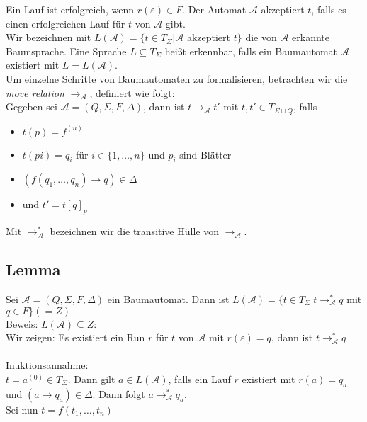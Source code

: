\documentclass[titlepage]{article}
\begin{document}
Ein Lauf ist erfolgreich, wenn $r(\varepsilon) \in F$. 
Der Automat $\mathcal{A}$ akzeptiert $t$, falls es einen erfolgreichen Lauf
f\"ur $t$ von $\mathcal{A}$ gibt.\\
Wir bezeichnen mit $L(\mathcal{A}) = \{t \in T_{\Sigma} | \mathcal{A}$ akzeptiert $t\}$ 
die von $\mathcal{A}$ erkannte Baumsprache. 
Eine Sprache $L \subseteq T_{\Sigma}$ hei\ss t erkennbar, falls ein Baumautomat 
$\mathcal{A}$ existiert mit $L=L(\mathcal{A})$.\\

Um einzelne Schritte von Baumautomaten zu formalisieren, betrachten wir die 
\textit{move relation} $\rightarrow_{\mathcal{A}}$, 
definiert wie folgt:\\
Gegeben sei $\mathcal{A} = (Q, \Sigma, F, \Delta)$, dann ist 
$t \rightarrow _{\mathcal{A}} t'$ mit $t, t' \in T_{\Sigma \cup Q}$, falls

\begin{itemize}
	\item $t(p) = f^{(n)}$
	\item $t(pi) = q_i$ f\"ur $i \in \{1, \dots, n\}$ und $p_i$ sind Bl\"atter
	\item $(f(q_1, \dots, q_n) \rightarrow q) \in \Delta$
	\item und $t' = t[q]_p$
\end{itemize}

Mit $\rightarrow^\ast_{\mathcal{A}}$ bezeichnen wir die transitive H\"ulle von 
$\rightarrow_{\mathcal{A}}$.

\subsection{Lemma}

Sei $\mathcal{A} = (Q, \Sigma, F, \Delta)$ ein Baumautomat. Dann ist 
$L(\mathcal{A}) = \{t \in T_{\Sigma} | t \rightarrow^\ast_{\mathcal{A}} q$ mit 
$q \in F\} (=Z)$\\

Beweis: \glqq$L(\mathcal{A}) \subseteq Z$\grqq:\\

Wir zeigen: Es existiert ein Run $r$ f\"ur $t$ von $\mathcal{A}$ mit 
$r(\varepsilon) = q$, dann ist $t \rightarrow ^\ast_{\mathcal{A}} q$\\ \\
Inuktionsannahme:\\
$t=a^{(0)} \in T_{\Sigma}$. Dann gilt $a \in L({\mathcal{A}})$, falls ein Lauf $r$ 
existiert mit $r(a) = q_a$ und $(a \rightarrow q_a) \in \Delta$. 
Dann folgt $a \rightarrow^\ast_{{\mathcal{A}}} q_a$.\\
Sei nun $t=f(t_1, \dots, t_n)$\\ \\
\end{document}

